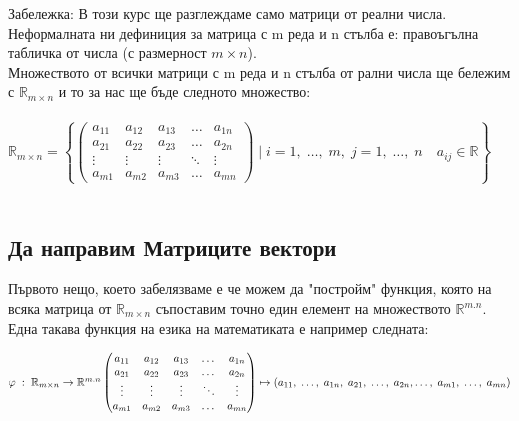 \documentclass[12pt]{article}
\newcommand{\R}{\mathbb{R}}
\begin{document}
Забележка: В този курс ще разглеждаме само матрици от реални числа. \\

Неформалната ни дефиниция за матрица с m реда и n стълба е: правоъгълна табличка от числа (с размерност $m \times n$). \\

Множеството от всички матрици с m реда и n стълба от рални числа ще бележим с $\R_{m \times n}$ и то за нас ще бъде следното множество: \\\\

$ \R_{m \times n} = \left\{
    \begin{pmatrix}
        a_{11} & a_{12} & a_{13} & \dots  & a_{1n} \\
        a_{21} & a_{22} & a_{23} & \dots  & a_{2n} \\
        \vdots & \vdots & \vdots & \ddots & \vdots \\
        a_{m1} & a_{m2} & a_{m3} & \dots  & a_{mn}
    \end{pmatrix} \; \Bigg| \; i = 1, \; \dots, \; m, \; j = 1, \; \dots, \; n \quad a_{ij} \in \R
\right\} $ \\\\

\subsection*{Да направим Матриците вектори}

Първото нещо, което забелязваме е че можем да "постройм" функция, която на всяка матрица от $\R_{m \times n}$ съпоставим точно един
елемент на множеството $\R^{m.n}$. Една такава функция на езика на математиката е например следната: \pagebreak

$
    \varphi \; : \; \R_{m \times n} \to \R^{m.n} \\\\
    \begin{pmatrix}
        a_{11} & a_{12} & a_{13} & \dots  & a_{1n} \\
        a_{21} & a_{22} & a_{23} & \dots  & a_{2n} \\
        \vdots & \vdots & \vdots & \ddots & \vdots \\
        a_{m1} & a_{m2} & a_{m3} & \dots  & a_{mn}
    \end{pmatrix} \mapsto (a_{11}, \; \dots, \; a_{1n}, \; a_{21}, \; \dots, \; a_{2n}, \dots, \; a_{m1}, \;  \dots, \; a_{mn})
$ \\\\
\end{document}
